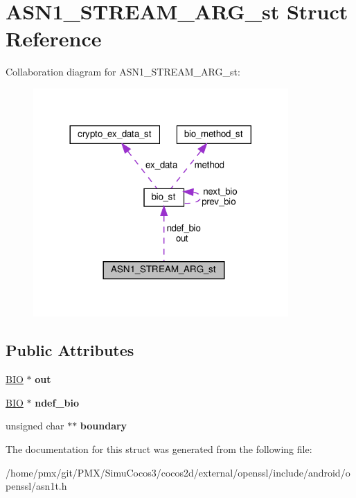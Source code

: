 \hypertarget{structASN1__STREAM__ARG__st}{}\section{A\+S\+N1\+\_\+\+S\+T\+R\+E\+A\+M\+\_\+\+A\+R\+G\+\_\+st Struct Reference}
\label{structASN1__STREAM__ARG__st}


Collaboration diagram for A\+S\+N1\+\_\+\+S\+T\+R\+E\+A\+M\+\_\+\+A\+R\+G\+\_\+st\+:
\nopagebreak
\begin{figure}[H]
\begin{center}
\leavevmode
\includegraphics[width=276pt]{structASN1__STREAM__ARG__st__coll__graph}
\end{center}
\end{figure}
\subsection*{Public Attributes}
\begin{DoxyCompactItemize}
\item 
\mbox{\label{structASN1__STREAM__ARG__st_a4cad27d0adbe17fc170419208dca7484}} 
\hyperlink{structbio__st}{B\+IO} $\ast$ {\bfseries out}
\item 
\mbox{\label{structASN1__STREAM__ARG__st_a73ad955a6c082f2125e1a219c58d0d48}} 
\hyperlink{structbio__st}{B\+IO} $\ast$ {\bfseries ndef\+\_\+bio}
\item 
\mbox{\label{structASN1__STREAM__ARG__st_adc52cbb3531f9e121937ddef9cd5d5ac}} 
unsigned char $\ast$$\ast$ {\bfseries boundary}
\end{DoxyCompactItemize}


The documentation for this struct was generated from the following file\+:\begin{DoxyCompactItemize}
\item 
/home/pmx/git/\+P\+M\+X/\+Simu\+Cocos3/cocos2d/external/openssl/include/android/openssl/asn1t.\+h\end{DoxyCompactItemize}
